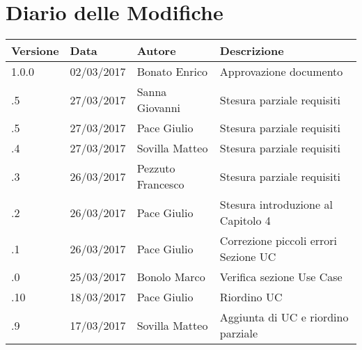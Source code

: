 \section*{Diario delle Modifiche}
\begin{longtabu} to \textwidth {
	X[4,l,p]
	X[4,l,p]
	X[4,l,p]
	X[8,l,p]}
	\toprule
		 Versione & Data & Autore & Descrizione \\
		\midrule
		\endhead
		
		1.0.0 & 02/03/2017 & Bonato Enrico & Approvazione documento\\
		\addlinespace[0.2em]
		\midrule
		\addlinespace[0.2em]
		\addlinespace[0.2em]
		\midrule
		.5 & 27/03/2017 & Sanna Giovanni & Stesura parziale requisiti\\
		\addlinespace[0.2em]
		\midrule
		.5 & 27/03/2017 & Pace Giulio & Stesura parziale requisiti\\
		\addlinespace[0.2em]
		\midrule
		.4 & 27/03/2017 & Sovilla Matteo & Stesura parziale requisiti\\
		\addlinespace[0.2em]
		\midrule
		.3 & 26/03/2017 & Pezzuto Francesco & Stesura parziale requisiti\\
		\addlinespace[0.2em]
		\midrule
		.2 & 26/03/2017 & Pace Giulio & Stesura introduzione al Capitolo 4\\
		\addlinespace[0.2em]
		\midrule
		.1 & 26/03/2017 & Pace Giulio & Correzione piccoli errori Sezione UC\\
		\addlinespace[0.2em]
		\midrule
		.0 & 25/03/2017 & Bonolo Marco & Verifica sezione Use Case\\
		\addlinespace[0.2em]
		\midrule
		.10 & 18/03/2017 & Pace Giulio & Riordino UC\\
		\addlinespace[0.2em]
		\midrule
		.9 & 17/03/2017 & Sovilla Matteo & Aggiunta di UC e riordino parziale\\

\end{longtabu}
